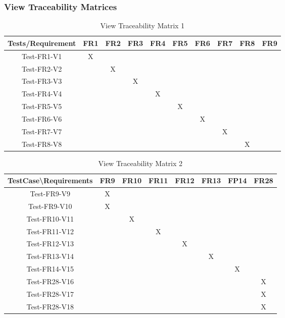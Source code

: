 \documentclass[12pt]{article}
\begin{document}
\subsubsection{View Traceability Matrices}
\begin{table}[htp]
\centering
\caption{View Traceability Matrix 1}
\begin{tabular}{|c|c|c|c|c|c|c|c|c|c|}
\hline
Tests/Requirement & FR1 & FR2 & FR3 & FR4 & FR5 & FR6 & FR7 & FR8 & FR9 \\
\hline
Test-FR1-V1       & X   &     &     &     &     &     &     &     &     \\
\hline
Test-FR2-V2       &     & X   &     &     &     &     &     &     &     \\
\hline
Test-FR3-V3       &     &     & X   &     &     &     &     &     &     \\
\hline
Test-FR4-V4       &     &     &     & X   &     &     &     &     &     \\
\hline
Test-FR5-V5       &     &     &     &     & X   &     &     &     &     \\
\hline
Test-FR6-V6       &     &     &     &     &     & X   &     &     &     \\
\hline
Test-FR7-V7       &     &     &     &     &     &     & X   &     &     \\
\hline
Test-FR8-V8       &     &     &     &     &     &     &     & X   &     \\
\hline
\end{tabular}
\end{table}
\begin{table}[htp]
\centering
\caption{View Traceability Matrix 2}
\begin{tabular}{|c|c|c|c|c|c|c|c|}
\hline
TestCase\textbackslash{}Requirements & FR9 & FR10 & FR11 & FR12 & FR13 & FP14 & FR28 \\ \hline
Test-FR9-V9                          & X   &      &      &      &      &      &      \\ \hline
Test-FR9-V10                         & X   &      &      &      &      &      &      \\ \hline
Test-FR10-V11                        &     & X    &      &      &      &      &      \\ \hline
Test-FR11-V12                        &     &      & X    &      &      &      &      \\ \hline
Test-FR12-V13                        &     &      &      & X    &      &      &      \\ \hline
Test-FR13-V14                        &     &      &      &      & X    &      &      \\ \hline
Test-FR14-V15                        &     &      &      &      &      & X    &      \\ \hline
Test-FR28-V16                        &     &      &      &      &      &      & X    \\ \hline
Test-FR28-V17                        &     &      &      &      &      &      & X    \\ \hline
Test-FR28-V18                        &     &      &      &      &      &      & X    \\ \hline
\end{tabular}
\end{table}
\newpage
\end{document}
